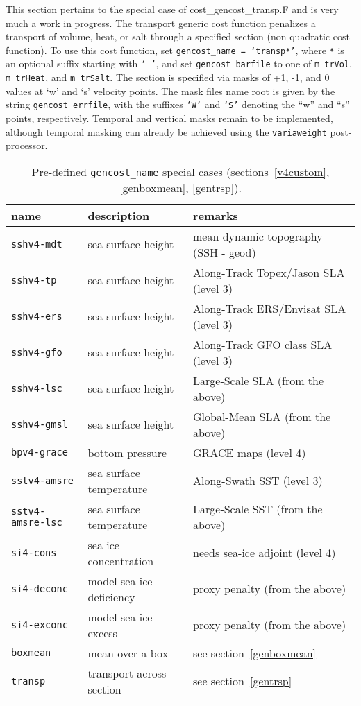 This section pertains to the special case of cost\_gencost\_transp.F and is very much a work in progress. The transport generic cost function penalizes a transport of volume, heat, or salt through a specified section (non quadratic cost function). To use this cost function, set \texttt{gencost\_name = `transp*'}, where \texttt{*} is an optional suffix starting with \texttt{`\_'}, and set \texttt{gencost\_barfile} to one of \texttt{m\_trVol}, \texttt{m\_trHeat}, and \texttt{m\_trSalt}. The section is specified via masks of +1, -1, and 0 values at `w' and `s' velocity points. The mask files name root is given by the string \texttt{gencost\_errfile}, with the suffixes \texttt{`W'} and \texttt{`S'} denoting the ``w'' and ``s'' points, respectively. Temporal and vertical masks remain to be implemented, although temporal masking can already be achieved using the \texttt{variaweight} post-processor.

\begin{table}[!ht]
\centering
\begin{tabular}{lll}
name						&	description					&	remarks \\ \hline\hline
\texttt{sshv4-mdt}			&	sea surface height			&	mean dynamic topography (SSH - geod) \\
\texttt{sshv4-tp}				&	sea surface height			&	Along-Track Topex/Jason SLA (level 3) \\
\texttt{sshv4-ers}			&	sea surface height			&	Along-Track ERS/Envisat SLA (level 3)\\
\texttt{sshv4-gfo}			&	sea surface height			&	Along-Track GFO class SLA (level 3)\\
\texttt{sshv4-lsc}			&	sea surface height			&	Large-Scale SLA (from the above)\\
\texttt{sshv4-gmsl}			&	sea surface height			&	Global-Mean SLA (from the above)\\ \hline
\texttt{bpv4-grace}			&	bottom pressure			&	GRACE maps (level 4) \\ \hline
\texttt{sstv4-amsre}			&	sea surface temperature		&	Along-Swath SST (level 3)\\
\texttt{sstv4-amsre-lsc}		&	sea surface temperature		&	Large-Scale SST (from the above)\\ \hline
\texttt{si4-cons}				&	sea ice concentration		& 	needs sea-ice adjoint (level 4)\\
\texttt{si4-deconc}			&	model sea ice deficiency		& 	proxy penalty (from the above)\\
\texttt{si4-exconc}			&	model sea ice excess		& 	proxy penalty (from the above)\\ \hline
\texttt{boxmean}			&	mean over a box			&	see section~\ref{genboxmean}  \\
\texttt{transp}				&	transport across section		&	see section~\ref{gentrsp} \\ 
\end{tabular}
\caption{Pre-defined \texttt{gencost\_name} special cases (sections~\ref{v4custom}, \ref{genboxmean}, \ref{gentrsp}).}
\label{tbl:gencost_ecco_name}
\end{table}

